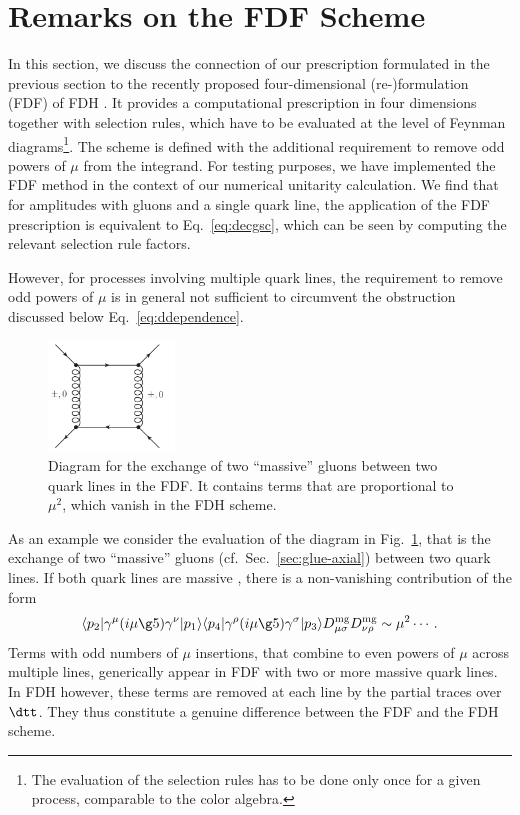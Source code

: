 

\section{Remarks on the FDF Scheme}
\label{sec:fdf}
In this section, we discuss the connection of our prescription
formulated in the previous section to the
recently proposed four-dimensional (re-)formulation (FDF) of FDH \cite{Fazio:2014xea}.
It provides a computational prescription in four dimensions together with
selection rules, which have to be evaluated at the level of Feynman
diagrams\footnote{The evaluation of the selection rules has to be done
  only once for a given process, comparable to the color algebra.}. The
scheme is defined with the additional requirement to
remove odd powers of $\mu$ from the integrand. For testing purposes, we have implemented the FDF method in the context of our numerical unitarity calculation. We find that for amplitudes with gluons and a single quark line, the application of
the FDF prescription is equivalent to Eq.~\eqref{eq:decgsc}, which can
be seen by computing the relevant selection rule factors.


However, for processes involving multiple quark lines, the requirement to remove
odd powers of $\mu$ is in general not sufficient to circumvent the obstruction discussed below
Eq.~\eqref{eq:ddependence}.
\begin{figure}%
  \centering
  \includegraphics[clip,width=0.3\textwidth]{figures/mu2_draft.pdf}
  \caption{Diagram for the exchange of two ``massive''
    gluons between two quark lines in the FDF. It contains terms that
  are proportional to $\mu^2$, which vanish in the FDH scheme. }
  \label{fig:mu2ex}
\end{figure}
As an example we consider the evaluation of the diagram in Fig.~\ref{fig:mu2ex}, that
is the exchange of two ``massive'' gluons (cf.~Sec.~\ref{sec:glue-axial}) between two quark lines. If both
quark lines are massive%
, there is a non-vanishing contribution of the form
\begin{align}\label{eq:probfdf}
  \langle p_2|\gamma^\mu (i\mu\g5) \gamma^\nu  |p_1\rangle   \langle
  p_4|\gamma^\rho(i\mu\g5) \gamma^\sigma  |p_3\rangle
  D^{\text{mg}}_{\mu\sigma} D^{\text{mg}}_{\nu\rho} \sim \mu^2 \cdots.
\end{align}
Terms with odd numbers of $\mu$ insertions, that combine to even powers
of $\mu$ across multiple lines, generically appear in FDF with two
or more massive quark lines.
In FDH however, these terms are removed at each line by the partial traces over
$\dtt$. They thus constitute a genuine difference between the FDF and
the FDH scheme.

